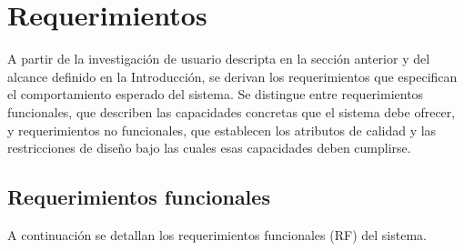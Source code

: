 \section{Requerimientos}

A partir de la investigación de usuario descripta en la sección anterior y del alcance definido en la Introducción, se derivan los requerimientos que especifican el comportamiento esperado del sistema.
Se distingue entre requerimientos funcionales, que describen las capacidades concretas que el sistema debe ofrecer, y requerimientos no funcionales, que establecen los atributos de calidad y las restricciones de diseño bajo las cuales esas capacidades deben cumplirse.

\subsection{Requerimientos funcionales}

A continuación se detallan los requerimientos funcionales (RF) del sistema.

